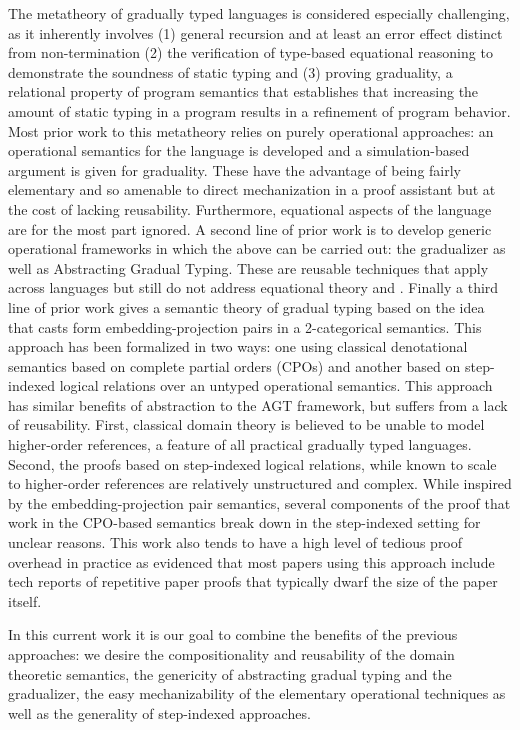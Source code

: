 \documentclass[acmsmall,screen]{acmart}
\begin{document}
The metatheory of gradually typed languages is considered especially
challenging, as it inherently involves (1) general recursion and at
least an error effect distinct from non-termination (2) the
verification of type-based equational reasoning to demonstrate the
soundness of static typing and (3) proving graduality, a relational
property of program semantics that establishes that increasing the
amount of static typing in a program results in a refinement of
program behavior. Most prior work to this metatheory relies on purely
operational approaches: an operational semantics for the language is
developed and a simulation-based argument is given for
graduality. These have the advantage of being fairly elementary and so
amenable to direct mechanization in a proof assistant but at the cost
of lacking reusability. Furthermore, equational aspects of the
language are for the most part ignored. A second line of prior work is
to develop generic operational frameworks in which the above can be
carried out: the gradualizer as well as Abstracting Gradual
Typing. These are reusable techniques that apply across languages but
still do not address equational theory and . Finally a third line of
prior work gives a semantic theory of gradual typing based on the idea
that casts form embedding-projection pairs in a 2-categorical
semantics. This approach has been formalized in two ways: one using
classical denotational semantics based on complete partial orders
(CPOs) and another based on step-indexed logical relations over an
untyped operational semantics. This approach has similar benefits of
abstraction to the AGT framework, but suffers from a lack of
reusability. First, classical domain theory is believed to be unable
to model higher-order references, a feature of all practical gradually
typed languages. Second, the proofs based on step-indexed logical
relations, while known to scale to higher-order references are
relatively unstructured and complex. While inspired by the
embedding-projection pair semantics, several components of the proof
that work in the CPO-based semantics break down in the step-indexed
setting for unclear reasons. This work also tends to have a high level
of tedious proof overhead in practice as evidenced that most papers
using this approach include tech reports of repetitive paper proofs
that typically dwarf the size of the paper itself.

In this current work it is our goal to combine the benefits of the
previous approaches: we desire the compositionality and reusability of
the domain theoretic semantics, the genericity of abstracting gradual
typing and the gradualizer, the easy mechanizability of the elementary
operational techniques as well as the generality of step-indexed
approaches.
\end{document}
